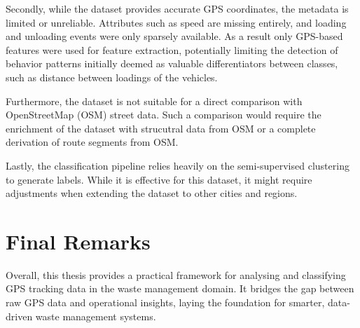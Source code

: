\documentclass[a4paper,12pt,twoside]{scrreprt}
\begin{document}
Secondly, while the dataset provides accurate GPS coordinates, the metadata is
limited or unreliable. Attributes such as speed are missing entirely, and
loading and
unloading events were only sparsely available. As a result only GPS-based
features
were used for feature extraction, potentially limiting the detection of
behavior patterns
initially deemed as valuable differentiators between classes, such as distance
between loadings of the vehicles.

Furthermore, the dataset is not suitable for a direct comparison with
OpenStreetMap (OSM) street data. Such a comparison would require the enrichment
of the dataset with strucutral data from OSM or a complete derivation of route
segments from OSM.

Lastly, the classification pipeline relies heavily on the semi-supervised
clustering
to generate labels. While it is effective for this dataset, it might require
adjustments
when extending the dataset to other cities and regions.

\section{Final Remarks}
Overall, this thesis provides a practical framework for analysing and
classifying GPS tracking data in the waste management domain. It bridges the
gap between raw GPS data and operational insights,
laying the foundation for smarter, data-driven waste management systems.

\clearpage
{}
{}
\printbibliography


\end{document}
